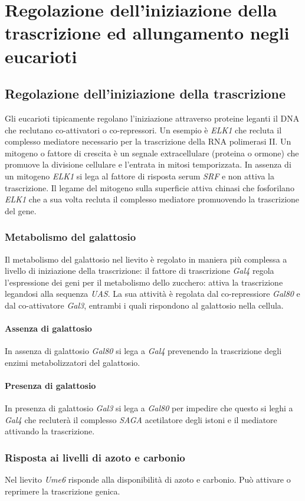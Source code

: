 \section{Regolazione dell'iniziazione della trascrizione ed allungamento negli eucarioti}
\subsection{Regolazione dell'iniziazione della trascrizione}
Gli eucarioti tipicamente regolano l'iniziazione attraverso proteine leganti il DNA che reclutano co-attivatori o co-repressori. Un esempio \`e \emph{ELK1} che recluta il complesso
mediatore necessario per la trascrizione della RNA polimerasi II. Un mitogeno o fattore di crescita \`e un segnale extracellulare (proteina o ormone) che promuove la divisione
cellulare e l'entrata in mitosi temporizzata. In assenza di un mitogeno \emph{ELK1} si lega al fattore di risposta serum \emph{SRF} e non attiva la trascrizione. Il legame del mitogeno
sulla superficie attiva chinasi che fosforilano \emph{ELK1} che a sua volta recluta il complesso mediatore promuovendo la trascrizione del gene. 
\subsubsection{Metabolismo del galattosio}
Il metabolismo del galattosio nel lievito \`e regolato in maniera pi\`u complessa a livello di iniziazione della trascrizione: il fattore di trascrizione \emph{Gal4} regola
l'espressione dei geni per il metabolismo dello zucchero: attiva la trascrizione legandosi alla sequenza \emph{UAS}. La sua attivit\`a \`e regolata dal co-repressiore \emph{Gal80} e 
dal co-attivatore \emph{Gal3}, entrambi i quali rispondono al galattosio nella cellula. 
\paragraph{Assenza di galattosio}
In assenza di galattosio \emph{Gal80} si lega a \emph{Gal4} prevenendo la trascrizione degli enzimi metabolizzatori del galattosio. 
\paragraph{Presenza di galattosio}
In presenza di galattosio \emph{Gal3} si lega a \emph{Gal80} per impedire che questo si leghi a \emph{Gal4} che recluter\`a il complesso \emph{SAGA} acetilatore degli istoni e il 
mediatore attivando la trascrizione.
\subsubsection{Risposta ai livelli di azoto e carbonio}
Nel lievito \emph{Ume6} risponde alla disponibilit\`a di azoto e carbonio. Pu\`o attivare o reprimere la trascrizione genica.
